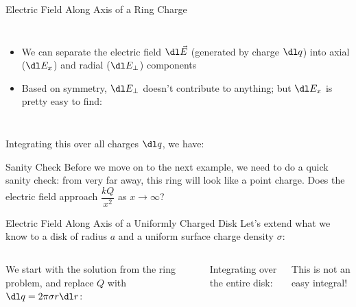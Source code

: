 \documentclass[12pt,aspectratio=169]{beamer}
\begin{document}
\begin{frame}{Electric Field Along Axis of a Ring Charge}
  \begin{columns}
    \vspace{.1in}

    \begin{itemize}
    \item We can separate the electric field $\dl\vec E$ (generated by charge
      $\dl q$) into axial ($\dl E_x$) and radial ($\dl E_\perp$) components
    \item Based on symmetry, $\dl E_\perp$ doesn't contribute to anything; but
      $\dl E_x$ is pretty easy to find:

    \end{itemize}
  \end{columns}

  \vspace{.1in}Integrating this over all charges $\dl q$, we have:
  
\end{frame}



\begin{frame}{Sanity Check}
  Before we move on to the next example, we need to do a quick sanity check:
  from very far away, this ring will look like a point charge. Does the electric
  field approach $\dfrac{kQ}{x^2}$ as $x\to\infty$?
\end{frame}



\begin{frame}{Electric Field Along Axis of a Uniformly Charged Disk}
  Let's extend what we know to a disk of radius $a$ and a uniform surface
  charge density $\sigma$:

  \vspace{.1in}
  \begin{columns}

    We start with the solution from the ring problem, and replace $Q$ with
    $\dl q=2\pi\sigma r\dl r$:


    Integrating over the entire disk:

    
    This is not an easy integral!
  \end{columns}
\end{frame}
\end{document}
